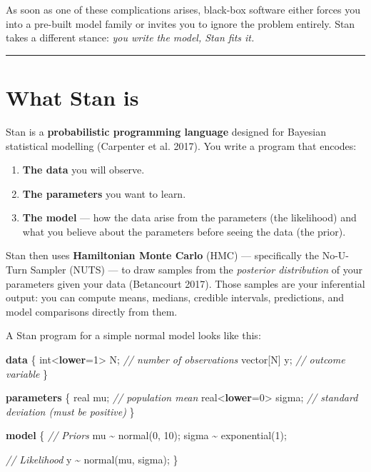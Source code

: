\documentclass[
  11pt,
  a4paper,
  oneside,
  openany]{scrbook}
\newenvironment{Shaded}{\begin{snugshade}}{\end{snugshade}}
\newcommand{\CommentTok}[1]{\textcolor[rgb]{0.56,0.35,0.01}{\textit{#1}}}
\newcommand{\DataTypeTok}[1]{\textcolor[rgb]{0.13,0.29,0.53}{#1}}
\newcommand{\DecValTok}[1]{\textcolor[rgb]{0.00,0.00,0.81}{#1}}
\newcommand{\KeywordTok}[1]{\textcolor[rgb]{0.13,0.29,0.53}{\textbf{#1}}}
\newcommand{\NormalTok}[1]{#1}
\providecommand{\tightlist}{%
  \setlength{\itemsep}{0pt}\setlength{\parskip}{0pt}}\usepackage{longtable,booktabs,array}
\begin{document}
As soon as one of these complications arises, black-box software either
forces you into a pre-built model family or invites you to ignore the
problem entirely. Stan takes a different stance: \emph{you write the
model, Stan fits it.}

\begin{center}\rule{0.5\linewidth}{0.5pt}\end{center}

\section{What Stan is}\label{what-stan-is}

Stan is a \textbf{probabilistic programming language} designed for
Bayesian statistical modelling (Carpenter et al. 2017). You write a
program that encodes:

\begin{enumerate}
\def\labelenumi{\arabic{enumi}.}
\tightlist
\item
  \textbf{The data} you will observe.
\item
  \textbf{The parameters} you want to learn.
\item
  \textbf{The model} --- how the data arise from the parameters (the
  likelihood) and what you believe about the parameters before seeing
  the data (the prior).
\end{enumerate}

Stan then uses \textbf{Hamiltonian Monte Carlo} (HMC) --- specifically
the No-U-Turn Sampler (NUTS) --- to draw samples from the
\emph{posterior distribution} of your parameters given your data
(Betancourt 2017). Those samples are your inferential output: you can
compute means, medians, credible intervals, predictions, and model
comparisons directly from them.

A Stan program for a simple normal model looks like this:

\begin{Shaded}
\begin{Highlighting}[]
\KeywordTok{data}\NormalTok{ \{}
  \DataTypeTok{int}\NormalTok{\textless{}}\KeywordTok{lower}\NormalTok{=}\DecValTok{1}\NormalTok{\textgreater{} N;       }\CommentTok{// number of observations}
  \DataTypeTok{vector}\NormalTok{[N] y;          }\CommentTok{// outcome variable}
\NormalTok{\}}

\KeywordTok{parameters}\NormalTok{ \{}
  \DataTypeTok{real}\NormalTok{ mu;              }\CommentTok{// population mean}
  \DataTypeTok{real}\NormalTok{\textless{}}\KeywordTok{lower}\NormalTok{=}\DecValTok{0}\NormalTok{\textgreater{} sigma;  }\CommentTok{// standard deviation (must be positive)}
\NormalTok{\}}

\KeywordTok{model}\NormalTok{ \{}
  \CommentTok{// Priors}
\NormalTok{  mu    \textasciitilde{} normal(}\DecValTok{0}\NormalTok{, }\DecValTok{10}\NormalTok{);}
\NormalTok{  sigma \textasciitilde{} exponential(}\DecValTok{1}\NormalTok{);}

  \CommentTok{// Likelihood}
\NormalTok{  y \textasciitilde{} normal(mu, sigma);}
\NormalTok{\}}
\end{Highlighting}
\end{Shaded}
\end{document}

